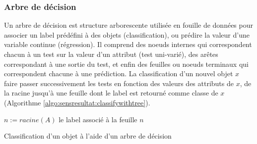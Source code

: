 \subsubsection{Arbre de décision}
Un arbre de décision est structure arborescente utilisée en fouille de données pour associer un label prédéfini à des objets (classification), ou prédire la valeur d'une variable continue (régression). Il comprend des noeuds internes qui correspondent chacun à un test sur la valeur d'un attribut (test uni-varié), des arêtes correspondant à une sortie du test, et enfin des feuilles ou noeuds terminaux qui correspondent chacune à une prédiction. La classification d'un nouvel objet $x$ faire passer successivement les tests en fonction des valeurs des attributs de $x$,  de la racine jusqu'à une feuille dont le label est retourné comme classe de $x$ (Algorithme \ref{algo:sensresultat:classifywithtree}).

\begin{algorithm}[H] \small
	$n := racine(A)$ \; 
	\Return le label associé à la feuille $n$\;
	\caption{Classification d'un objet à l'aide d'un arbre de décision} \label{algo:sensresultat:classifywithtree}
\end{algorithm}

